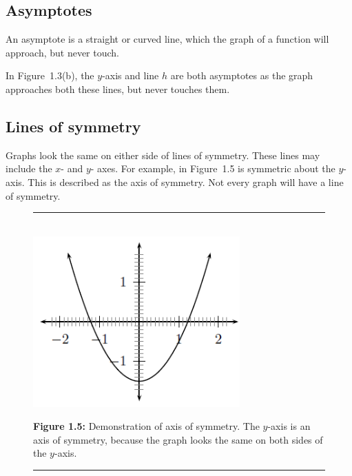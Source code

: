 \subsection*{ Asymptotes}
\nopragebreak
\label{m39337*id236837}An asymptote is a straight or curved line, which the graph of a function will approach, but never touch.\par 
\label{m39337*id236844}In Figure~1.3(b), the $y$-axis and line $h$ are both asymptotes as the graph approaches both these lines, but never touches them.\par 
\label{m39337*uid50}
\subsection{ Lines of symmetry}
\nopagebreak
\label{m39337*id236883}Graphs look the same on either side of lines of symmetry. These lines may include the $x$- and $y$- axes. For example, in Figure~1.5 is symmetric about the $y$-axis. This is described as the axis of symmetry. Not every graph will have a line of symmetry.\par 
\setcounter{subfigure}{0}
\begin{figure}[H] %
\begin{center}
\rule[.1in]{\figurerulewidth}{.005in} \\
\label{m39337*uid51!!!underscore!!!media}\label{m39337*uid51!!!underscore!!!printimage}\includegraphics[width=300px]{col11306.imgs/m39337_MG10C11_036.png} %
\vspace{2pt}
\vspace{\rubberspace}\par \begin{cnxcaption}
\small \textbf{Figure 1.5: }Demonstration of axis of symmetry. The $y$-axis is an axis of symmetry, because the graph looks the same on both sides of the $y$-axis.
\end{cnxcaption}
\vspace{.1in}
\rule[.1in]{\figurerulewidth}{.005in} \\
\end{center}
\end{figure}       
\label{m39337*uid52}
